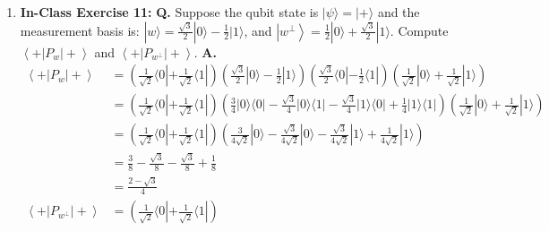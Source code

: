 \documentclass[main.tex]{subfiles}
\begin{document}
\begin{enumerate}
\item[] \textbf{In-Class Exercise 11:}  \textbf{Q.} Suppose the qubit state is $|\psi\rangle=|+\rangle$ and the measurement basis is: $|w\rangle=\frac{\sqrt{3}}{2}|0\rangle-\frac{1}{2}|1\rangle$, and $\left|w^{\perp}\right\rangle=\frac{1}{2}|0\rangle+\frac{\sqrt{3}}{2}|1\rangle .$ Compute $\left\langle+\left|P_{w}\right|+\right\rangle$ and $\left\langle+\left|P_{w^{\perp}}\right|+\right\rangle .$  \textbf{A.}
    \begin{align*}
        \left\langle+\left|P_{w}\right|+\right\rangle           & = \left(\frac{1}{\sqrt{2}}\langle0| + \frac{1}{\sqrt{2}} \langle 1|\right)
                                                                \left(\frac{\sqrt{3}}{2}|0\rangle-\frac{1}{2}|1\rangle\right)
                                                                \left(\frac{\sqrt{3}}{2}\langle0|-\frac{1}{2}\langle1|\right)
                                                                \left(\frac{1}{\sqrt{2}}|0\rangle + \frac{1}{\sqrt{2}} |1\rangle\right)\\
                                                                & = \left(\frac{1}{\sqrt{2}}\langle0| + \frac{1}{\sqrt{2}} \langle 1|\right)
                                                                \left(\frac{3}{4}|0\rangle\langle0| - \frac{\sqrt{3}}{4}|0\rangle\langle1| - 
                                                                \frac{\sqrt{3}}{4}|1\rangle\langle0| + \frac{1}{4}|1\rangle\langle1|\right)
                                                                \left(\frac{1}{\sqrt{2}}|0\rangle + \frac{1}{\sqrt{2}} |1\rangle\right)\\
                                                                & = \left(\frac{1}{\sqrt{2}}\langle0| + \frac{1}{\sqrt{2}} \langle 1|\right)
                                                                \left(\frac{3}{4\sqrt{2}}|0\rangle
                                                                - \frac{\sqrt{3}}{4\sqrt{2}}|0\rangle
                                                                - \frac{\sqrt{3}}{4\sqrt{2}}|1\rangle
                                                                + \frac{1}{4\sqrt{2}}|1\rangle\right)\\
                                                                & = \frac{3}{8} - \frac{\sqrt{3}}{8} - \frac{\sqrt{3}}{8} + \frac{1}{8}\\
                                                                & = \frac{2-\sqrt{3}}{4}\\
        \left\langle+\left|P_{w^{\perp}}\right|+\right\rangle   & = \left(\frac{1}{\sqrt{2}}\langle0| + \frac{1}{\sqrt{2}} \langle 1|\right)

\end{align*}
\end{enumerate}
\end{document}
